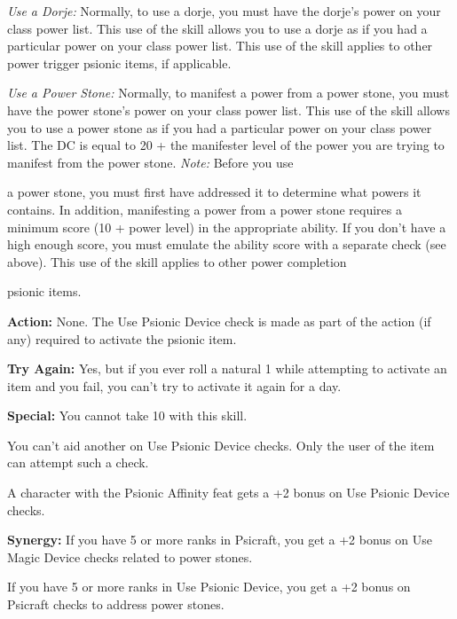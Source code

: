 \documentclass{article}
\begin{document}
\textit{Use a Dorje: }Normally, to use a dorje, you must have the dorje's power 
on your class power list. This use of the skill allows you to use a dorje as if 
you had a particular power on your class power list. This use of the skill applies 
to other power trigger psionic items, if applicable.

\textit{Use a Power Stone: }Normally, to manifest a power from a power stone, you 
must have the power stone's power on your class power list. This use of the skill 
allows you to use a power stone as if you had a particular power on your class 
power list. The DC is equal to 20 + the manifester level of the power you are trying 
to manifest from the power stone. \textit{Note: }Before you use

a power stone, you must first have addressed it to determine what powers it contains. 
In addition, manifesting a power from a power stone requires a minimum score (10 
+ power level) in the appropriate ability. If you don't have a high enough score, 
you must emulate the ability score with a separate check (see above). This use 
of the skill applies to other power completion

psionic items.

\textbf{Action:} None. The Use Psionic Device check is made as part of the action 
(if any) required to activate the psionic item.

\textbf{Try Again:} Yes, but if you ever roll a natural 1 while attempting to activate 
an item and you fail, you can't try to activate it again for a day.

\textbf{Special:} You cannot take 10 with this skill.

You can't aid another on Use Psionic Device checks. Only the user of the item can 
attempt such a check.

A character with the Psionic Affinity feat gets a +2 bonus on Use Psionic Device 
checks.

\textbf{Synergy: }If you have 5 or more ranks in Psicraft, you get a +2 bonus on 
Use Magic Device checks related to power stones.

If you have 5 or more ranks in Use Psionic Device, you get a +2 bonus on Psicraft 
checks to address power stones.

\newpage
\end{document}
